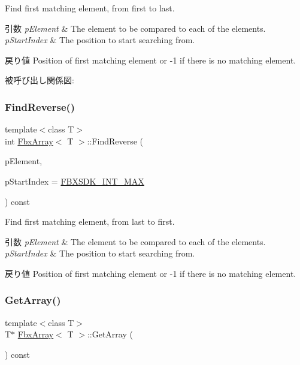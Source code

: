 Find first matching element, from first to last. 
\begin{DoxyParams}{引数}
{\em p\+Element} & The element to be compared to each of the elements. \\
\hline
{\em p\+Start\+Index} & The position to start searching from. \\
\hline
\end{DoxyParams}
\begin{DoxyReturn}{戻り値}
Position of first matching element or -\/1 if there is no matching element. 
\end{DoxyReturn}
被呼び出し関係図\+:
\mbox{\label{class_fbx_array_ae2dc6ac4c90e3a0724787cec5ebdeb05}} 
\subsubsection{\texorpdfstring{Find\+Reverse()}{FindReverse()}}
{\footnotesize\ttfamily template$<$class T$>$ \\
int \hyperlink{class_fbx_array}{Fbx\+Array}$<$ T $>$\+::Find\+Reverse (\begin{DoxyParamCaption}\item[{const T \&}]{p\+Element,  }\item[{const int}]{p\+Start\+Index = {\ttfamily \hyperlink{fbxtypes_8h_afb502e98178f45295bfde50dd04483d3}{F\+B\+X\+S\+D\+K\+\_\+\+I\+N\+T\+\_\+\+M\+AX}} }\end{DoxyParamCaption}) const}

Find first matching element, from last to first. 
\begin{DoxyParams}{引数}
{\em p\+Element} & The element to be compared to each of the elements. \\
\hline
{\em p\+Start\+Index} & The position to start searching from. \\
\hline
\end{DoxyParams}
\begin{DoxyReturn}{戻り値}
Position of first matching element or -\/1 if there is no matching element. 
\end{DoxyReturn}
\mbox{\label{class_fbx_array_a3ac872b6e74391897a028bc87f823979}} 
\subsubsection{\texorpdfstring{Get\+Array()}{GetArray()}}
{\footnotesize\ttfamily template$<$class T$>$ \\
T$\ast$ \hyperlink{class_fbx_array}{Fbx\+Array}$<$ T $>$\+::Get\+Array (\begin{DoxyParamCaption}{ }\end{DoxyParamCaption}) const}



